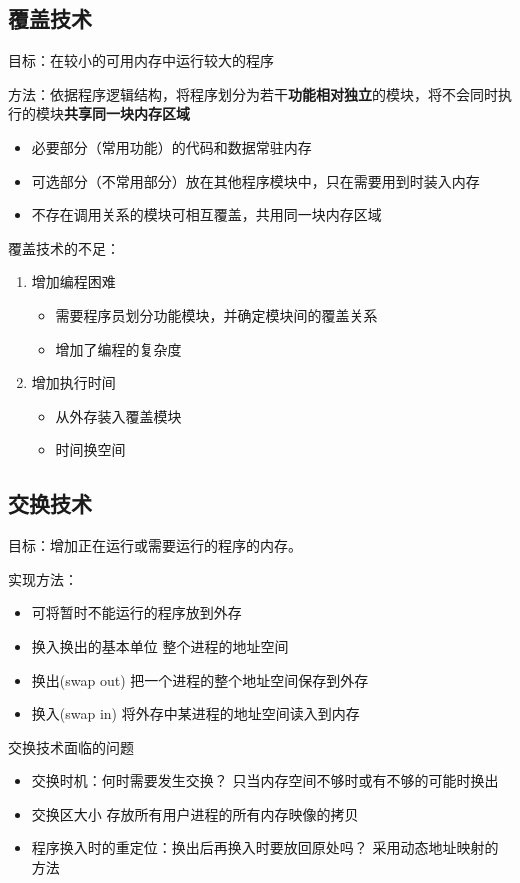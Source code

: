 \subsection{覆盖技术}
目标：在较小的可用内存中运行较大的程序
\par 方法：依据程序逻辑结构，将程序划分为若干\textbf{功能相对独立}的模块，将不会同时执行的模块\textbf{共享同一块内存区域}
\begin{itemize}
	\item 必要部分（常用功能）的代码和数据常驻内存
	\item 可选部分（不常用部分）放在其他程序模块中，只在需要用到时装入内存
	\item 不存在调用关系的模块可相互覆盖，共用同一块内存区域
\end{itemize}
覆盖技术的不足：
\begin{enumerate}
	\item 增加编程困难
	\begin{itemize}
		\item 需要程序员划分功能模块，并确定模块间的覆盖关系
		\item 增加了编程的复杂度
	\end{itemize}
	\item 增加执行时间
	\begin{itemize}
		\item 从外存装入覆盖模块
		\item 时间换空间
	\end{itemize}
\end{enumerate}
\subsection{交换技术}
目标：增加正在运行或需要运行的程序的内存。
\par 实现方法：
\begin{itemize}
	\item 可将暂时不能运行的程序放到外存
	\item 换入换出的基本单位
	\subitem 整个进程的地址空间
	\item 换出(swap out)
	\subitem 把一个进程的整个地址空间保存到外存
	\item 换入(swap in)
	\subitem 将外存中某进程的地址空间读入到内存
\end{itemize}
交换技术面临的问题
\begin{itemize}
	\item 交换时机：何时需要发生交换？
	\subitem 只当内存空间不够时或有不够的可能时换出
	\item 交换区大小
	\subitem 存放所有用户进程的所有内存映像的拷贝
	\item 程序换入时的重定位：换出后再换入时要放回原处吗？
	\subitem 采用动态地址映射的方法
\end{itemize}
